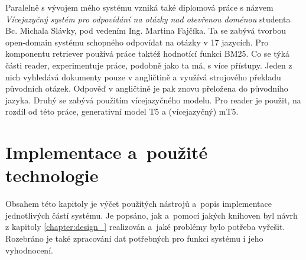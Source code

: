 Paralelně s vývojem mého systému vzniká také diplomová práce s názvem \textit{Vícejazyčný systém pro odpovídání na otázky nad otevřenou doménou} studenta Bc. Michala Slávky, pod vedením Ing. Martina Fajčíka. Ta se zabývá tvorbou open-domain systému schopného odpovídat na otázky v 17 jazycích. Pro komponentu retriever používá práce taktéž hodnotící funkci BM25. Co se týká části reader, experimentuje práce, podobně jako ta má, s více přístupy. Jeden z nich vyhledává dokumenty pouze v angličtině a využívá strojového překladu původních otázek. Odpověď v angličtině je pak znovu přeložena do původního jazyka. Druhý se zabývá použitím vícejazyčného modelu. Pro reader je použit, na rozdíl od této práce, generativní model T5 a (vícejazyčný) mT5.\pagebreak

\chapter{Implementace a~použité technologie}
\label{chapter:implementace}
Obsahem této kapitoly je výčet použitých nástrojů a~popis implementace jednotlivých částí systému. Je popsáno, jak a~pomocí jakých knihoven byl návrh z kapitoly \ref{chapter:design_} realizován a~jaké problémy bylo potřeba vyřešit. Rozebráno je také zpracování dat potřebných pro funkci systému i jeho vyhodnocení.

